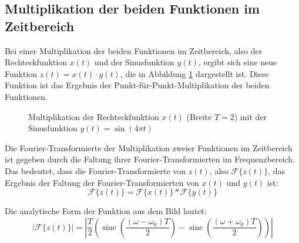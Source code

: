 \subsection{Multiplikation der beiden Funktionen im Zeitbereich}
Bei einer Multiplikation der beiden Funktionen im Zeitbereich, also der Rechteckfunktion $x(t)$ und der Sinusfunktion $y(t)$, ergibt sich eine neue Funktion $z(t) =  x(t) \cdot y(t)$, die in Abbildung \ref{fig:rechteck_sinus} dargestellt ist. Diese Funktion ist das Ergebnis der Punkt-für-Punkt-Multiplikation der beiden Funktionen.

\begin{figure}[H]
    \centering
    \caption{Multiplikation der Rechteckfunktion $x(t)$ (Breite $T=2$) mit der Sinusfunktion $y(t) = \sin(4\pi t)$}
    \label{fig:rechteck_sinus}
\end{figure}

Die Fourier-Transformierte der Multiplikation zweier Funktionen im Zeitbereich ist gegeben durch die Faltung ihrer Fourier-Transformierten im Frequenzbereich. Das bedeutet, dass die Fourier-Transformierte von $z(t)$, also $\mathcal{F}\{z(t)\}$, das Ergebnis der Faltung der Fourier-Transformierten von $x(t)$ und $y(t)$ ist:
\[
\mathcal{F}\{z(t)\} = \mathcal{F}\{x(t)\} * \mathcal{F}\{y(t)\}
\]

Die analytische Form der Funktion aus dem Bild lautet:
\[
\left| \mathcal{F}\{z(t)\} \right| = \left| \frac{T}{2} \left( 
\operatorname{sinc}\left(\frac{(\omega-\omega_0)T}{2}\right)
- 
\operatorname{sinc}\left(\frac{(\omega+\omega_0)T}{2}\right)
\right) \right|
\]

